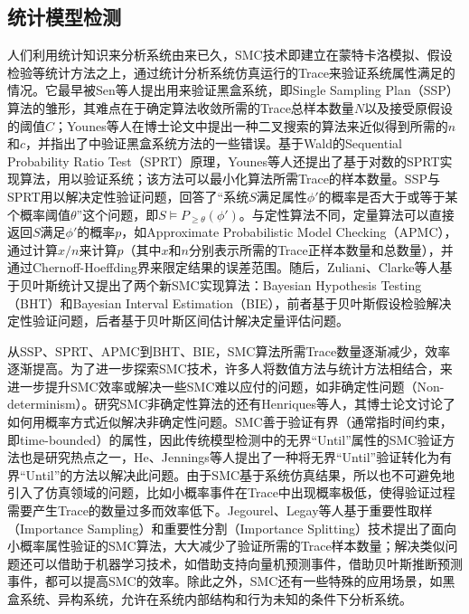 \subsection{统计模型检测}
人们利用统计知识来分析系统由来已久，SMC技术即建立在蒙特卡洛模拟、假设检验等统计方法之上，通过统计分析系统仿真运行的Trace来验证系统属性满足的情况。它最早被Sen等人提出用来验证黑盒系统\cite{sen2004statistical}，即Single Sampling Plan（SSP）算法的雏形，其难点在于确定算法收敛所需的Trace总样本数量$N$以及接受原假设的阈值$C$；Younes等人在博士论文\cite{younes2005verification}中提出一种二叉搜索的算法来近似得到所需的$n$和$c$，并指出了\cite{sen2004statistical}中验证黑盒系统方法的一些错误。基于Wald的Sequential Probability Ratio Test（SPRT）\cite{wald1945sequential}原理，Younes等人还提出了基于对数的SPRT实现算法\cite{younes2005verification,younes2006statistical}，用以验证系统；该方法可以最小化算法所需Trace的样本数量。SSP与SPRT用以解决定性验证问题，回答了“系统$S$满足属性$\phi '$的概率是否大于或等于某个概率阈值$\theta$”这个问题，即$S \models P_{\geq \theta} (\phi ')$。与定性算法不同，定量算法可以直接返回$S$满足$\phi '$的概率$p$，如Approximate Probabilistic Model Checking（APMC）\cite{herault2004approximate}，通过计算$x/n$来计算$p$（其中$x$和$n$分别表示所需的Trace正样本数量和总数量），并通过Chernoff-Hoeffding界来限定结果的误差范围。随后，Zuliani、Clarke等人基于贝叶斯统计又提出了两个新SMC实现算法：Bayesian Hypothesis Testing（BHT）和Bayesian Interval Estimation（BIE）\cite{jha2009bayesian,zuliani2013bayesian}，前者基于贝叶斯假设检验解决定性验证问题，后者基于贝叶斯区间估计解决定量评估问题。

从SSP、SPRT、APMC到BHT、BIE，SMC算法所需Trace数量逐渐减少，效率逐渐提高。为了进一步探索SMC技术，许多人将数值方法与统计方法相结合\cite{bogdoll2011partial,pavese2013automated}，来进一步提升SMC效率或解决一些SMC难以应付的问题，如非确定性问题（Non-determinism）。研究SMC非确定性算法的还有Henriques等人，其博士论文讨论了如何用概率方式近似解决非确定性问题\cite{henriques2012statistical}。SMC善于验证有界（通常指时间约束，即time-bounded）的属性，因此传统模型检测中的无界“Until”属性的SMC验证方法也是研究热点之一，He、Jennings等人提出了一种将无界“Until”验证转化为有界“Until”的方法以解决此问题\cite{he2010bounded,jennings2012two}。由于SMC基于系统仿真结果，所以也不可避免地引入了仿真领域的问题，比如小概率事件在Trace中出现概率极低，使得验证过程需要产生Trace的数量过多而效率低下。Jegourel、Legay等人基于重要性取样（Importance Sampling）和重要性分割（Importance Splitting）技术提出了面向小概率属性验证的SMC算法\cite{jegourel2012cross,jegourel2013importance}，大大减少了验证所需的Trace样本数量；解决类似问题还可以借助于机器学习技术，如\cite{du2015smc4rare}借助支持向量机预测事件，\cite{kumar2014efficient}借助贝叶斯推断预测事件，都可以提高SMC的效率。除此之外，SMC还有一些特殊的应用场景，如黑盒系统\cite{sen2004statistical}、异构系统\cite{basu2010statistical,vodenvcarevic2012learning}，允许在系统内部结构和行为未知的条件下分析系统。

